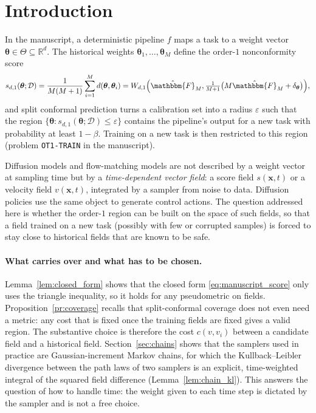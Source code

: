 \documentclass{article}
\newcommand{\RR}{\mathbb{R}}
\newcommand{\cD}{\mathcal{D}}                       %
\newcommand{\bth}{\boldsymbol{\theta}}
\newcommand{\bx}{\mathbf{x}}
\theoremstyle{plain}
\begin{document}
\section{Introduction}\label{sec:intro}

In the manuscript, a deterministic pipeline $f$ maps a task to a weight vector
$\bth\in\Theta\subseteq\RR^d$. The historical weights $\bth_1,\dots,\bth_M$ define the
order-$1$ nonconformity score
\begin{equation}\label{eq:manuscript_score}
  s_{d,1}(\bth;\cD)=\frac{1}{M(M+1)}\sum_{i=1}^M d(\bth,\bth_i)
  =W_{d,1}\Big(\hat{\mathbbm{F}}_M,\tfrac{1}{M+1}\big(M\hat{\mathbbm{F}}_M+\delta_{\bth}\big)\Big),
\end{equation}
and split conformal prediction turns a calibration set into a radius $\varepsilon$ such that
the region $\{\bth:s_{d,1}(\bth;\cD)\leq\varepsilon\}$ contains the pipeline's output for a
new task with probability at least $1-\beta$. Training on a new task is then restricted to
this region (problem \texttt{OT1-TRAIN} in the manuscript).

Diffusion models \citep{ho2020denoising,song2021score} and flow-matching models
\citep{lipman2023flow,liu2023flow,albergo2023building} are not described by a weight
vector at sampling time but by a \emph{time-dependent vector field}: a score field
$s(\bx,t)$ or a velocity field $v(\bx,t)$, integrated by a sampler from noise to data.
Diffusion policies \citep{chi2023diffusion} use the same object to generate control
actions. The question addressed here is whether the order-$1$ region can be built on the
space of such fields, so that a field trained on a new task (possibly with few or
corrupted samples) is forced to stay close to historical fields that are known to be safe.

\paragraph{What carries over and what has to be chosen.}
Lemma~\ref{lem:closed_form} shows that the closed form \eqref{eq:manuscript_score} only
uses the triangle inequality, so it holds for any pseudometric on fields.
Proposition~\ref{pr:coverage} recalls that split-conformal coverage does not even need a
metric: any cost that is fixed once the training fields are fixed gives a valid region. The
substantive choice is therefore the cost $c(v,v_i)$ between a candidate field and a
historical field. Section~\ref{sec:chains} shows that the samplers used in practice are
Gaussian-increment Markov chains, for which the Kullback--Leibler divergence between the
path laws of two samplers is an explicit, time-weighted integral of the squared field
difference (Lemma~\ref{lem:chain_kl}). This answers the question of how to handle time: the
weight given to each time step is dictated by the sampler and is not a free choice.
\end{document}

